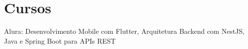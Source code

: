 \section{Cursos}
{\small Alura: Desenvolvimento Mobile com Flutter, Arquitetura Backend com NestJS, Java e Spring Boot para APIs REST}

